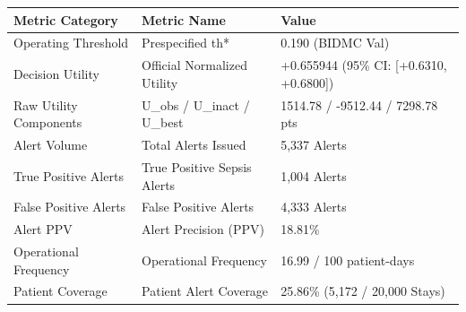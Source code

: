\begin{tabular}{lll}
\toprule
Metric Category & Metric Name & Value \\
\midrule
Operating Threshold & Prespecified th* & 0.190 (BIDMC Val) \\
Decision Utility & Official Normalized Utility & +0.655944 (95\% CI: [+0.6310, +0.6800]) \\
Raw Utility Components & U\_obs / U\_inact / U\_best & 1514.78 / -9512.44 / 7298.78 pts \\
Alert Volume & Total Alerts Issued & 5,337 Alerts \\
True Positive Alerts & True Positive Sepsis Alerts & 1,004 Alerts \\
False Positive Alerts & False Positive Alerts & 4,333 Alerts \\
Alert PPV & Alert Precision (PPV) & 18.81\% \\
Operational Frequency & Operational Frequency & 16.99 / 100 patient-days \\
Patient Coverage & Patient Alert Coverage & 25.86\% (5,172 / 20,000 Stays) \\
\bottomrule
\end{tabular}
